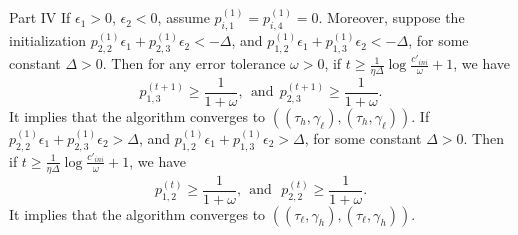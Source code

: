 \begin{theoremfour}{Part IV}
  If $\epsilon_1>0$, $\epsilon_2<0$, assume $p^{(1)}_{i,1}=p^{(1)}_{i,4}=0$. Moreover, suppose the initialization 
$p^{(1)}_{2,2}\epsilon_1+p^{(1)}_{2,3}\epsilon_2<-\Delta$, and $p^{(1)}_{1,2}\epsilon_1+p^{(1)}_{1,3}\epsilon_2<-\Delta$, for some constant $\Delta>0$. Then for any error tolerance $\omega>0$, if $t\geq \frac{1}{\eta\Delta}\log \frac{c'_{ini}}{\omega}+1$, we have  
\[
p^{(t+1)}_{1,3}\geq \frac{1}{1+\omega},\ \ \text{and}\ \ p^{(t+1)}_{2,3}\geq \frac{1}{1+\omega}.
\]
It implies that the algorithm converges to $((\tau_{h},\gamma_{\ell}),(\tau_{h},\gamma_{\ell}))$. If 
$p^{(1)}_{2,2}\epsilon_1+p^{(1)}_{2,3}\epsilon_2>\Delta$, and $p^{(1)}_{1,2}\epsilon_1+p^{(1)}_{1,3}\epsilon_2>\Delta$, for some constant $\Delta>0$. Then if $t\geq \frac{1}{\eta\Delta}\log \frac{c'_{ini}}{\omega}+1$, we have 
$$ p^{(t)}_{1,2} \geq \frac{1}{1+\omega},\ \ \text{and}\ \ \ p^{(t)}_{2,2}\geq \frac{1}{1+\omega}.$$
It implies that the algorithm converges to $((\tau_{\ell},\gamma_{h}),(\tau_{\ell},\gamma_{h}))$.   
\end{theoremfour}




